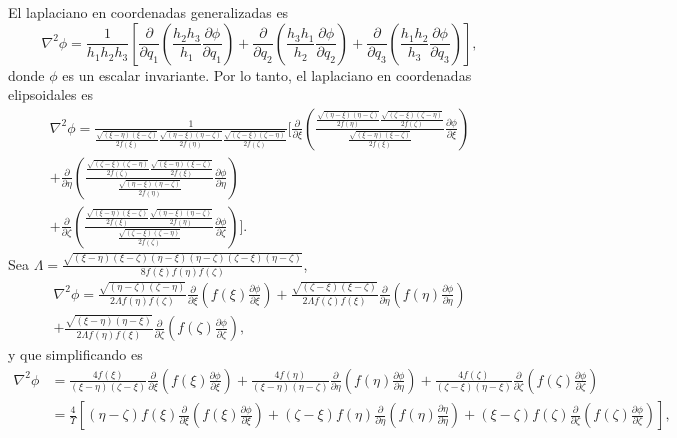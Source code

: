 El laplaciano en coordenadas generalizadas es \cite{Arfken}
\begin{equation}
    \nabla^2\phi=\frac{1}{h_1h_2h_3}\left[\frac{\partial}{\partial q_1}\left(\frac{h_2h_3}{h_1}\frac{\partial\phi}{\partial q_1}\right)+\frac{\partial}{\partial q_2}\left(\frac{h_3h_1}{h_2}\frac{\partial\phi}{\partial q_2}\right)+\frac{\partial}{\partial q_3}\left(\frac{h_1h_2}{h_3}\frac{\partial\phi}{\partial q_3}\right)\right],    
\end{equation}
donde $\phi$ es un escalar invariante. Por lo tanto, el laplaciano en coordenadas elipsoidales es
\begin{multline*}
    \nabla^2 \phi=\frac{1}{\frac{\sqrt{(\xi-\eta)(\xi-\zeta)}}{2f(\xi)}\frac{\sqrt{(\eta-\xi)(\eta-\zeta)}}{2f(\eta)}\frac{\sqrt{(\zeta-\xi)(\zeta-\eta)}}{2f(\zeta)}}\Bigg[\frac{\partial}{\partial\xi}\left(\frac{\frac{\sqrt{(\eta-\xi)(\eta-\zeta)}}{2f(\eta)}\frac{\sqrt{(\zeta-\xi)(\zeta-\eta)}}{2f(\zeta)}}{\frac{\sqrt{(\xi-\eta)(\xi-\zeta)}}{2f(\xi)}}\frac{\partial\phi}{\partial\xi}\right)\\+\frac{\partial}{\partial \eta}\left(\frac{\frac{\sqrt{(\zeta-\xi)(\zeta-\eta)}}{2f(\zeta)}\frac{\sqrt{(\xi-\eta)(\xi-\zeta)}}{2f(\xi)}}{\frac{\sqrt{(\eta-\xi)(\eta-\zeta)}}{2f(\eta)}}\frac{\partial\phi}{\partial\eta}\right)\\
    +\frac{\partial}{\partial \zeta}\left(\frac{\frac{\sqrt{(\xi-\eta)(\xi-\zeta)}}{2f(\xi)}\frac{\sqrt{(\eta-\xi)(\eta-\zeta)}}{2f(\eta)}}{\frac{\sqrt{(\zeta-\xi)(\zeta-\eta)}}{2f(\zeta)}}\frac{\partial\phi}{\partial\zeta}\right)\Bigg].
\end{multline*}
Sea $\Lambda=\frac{\sqrt{(\xi-\eta)(\xi-\zeta)(\eta-\xi)(\eta-\zeta)(\zeta-\xi)(\eta-\zeta)}}{8f(\xi)f(\eta)f(\zeta)}$,
\begin{multline*}
    \nabla^2\phi=\frac{\sqrt{(\eta-\zeta)(\zeta-\eta)}}{2\Lambda f(\eta)f(\zeta)}\frac{\partial}{\partial\xi}\left(f(\xi)\frac{\partial\phi}{\partial\xi}\right)+\frac{\sqrt{(\zeta-\xi)(\xi-\zeta)}}{2\Lambda f(\zeta)f(\xi)}\frac{\partial}{\partial\eta}\left(f(\eta)\frac{\partial\phi}{\partial\eta}\right)\\+\frac{\sqrt{(\xi-\eta)(\eta-\xi)}}{2\Lambda f(\eta)f(\xi)}\frac{\partial}{\partial\zeta}\left(f(\zeta)\frac{\partial\phi}{\partial\zeta}\right),
\end{multline*}
y que simplificando es
\begin{align}
    \nabla^2\phi&=\frac{4f(\xi)}{(\xi-\eta)(\zeta-\xi)}\frac{\partial}{\partial\xi}\left(f(\xi)\frac{\partial\phi}{\partial\xi}\right)+\frac{4f(\eta)}{(\xi-\eta)(\eta-\zeta)}\frac{\partial}{\partial\eta}\left(f(\eta)\frac{\partial\phi}{\partial\eta}\right)+\frac{4f(\zeta)}{(\zeta-\xi)(\eta-\xi)}\frac{\partial}{\partial\zeta}\left(f(\zeta)\frac{\partial\phi}{\partial\zeta}\right)\nonumber\\
    &=\frac{4}{\Upsilon}\left[(\eta-\zeta)f(\xi)\frac{\partial}{\partial\xi}\left(f(\xi)\frac{\partial\phi}{\partial\xi}\right)+(\zeta-\xi)f(\eta)\frac{\partial}{\partial\eta}\left(f(\eta)\frac{\partial\eta}{\partial\eta}\right)+(\xi-\zeta)f(\zeta)\frac{\partial}{\partial\zeta}\left(f(\zeta)\frac{\partial\phi}{\partial\zeta}\right)\right],
\end{align}
